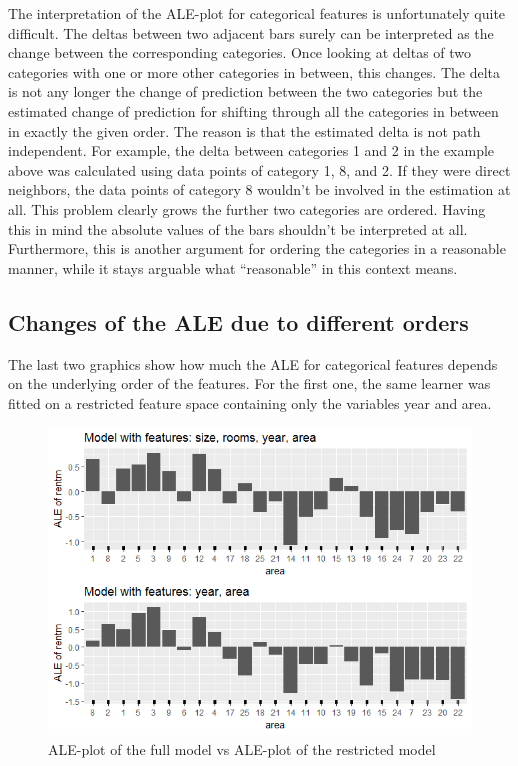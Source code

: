 \documentclass[
]{krantz}
\begin{document}
The interpretation of the ALE-plot for categorical features is unfortunately quite difficult. The deltas between two adjacent bars surely can be interpreted as the change between the corresponding categories. Once looking at deltas of two categories with one or more other categories in between, this changes. The delta is not any longer the change of prediction between the two categories but the estimated change of prediction for shifting through all the categories in between in exactly the given order. The reason is that the estimated delta is not path independent. For example, the delta between categories 1 and 2 in the example above was calculated using data points of category 1, 8, and 2. If they were direct neighbors, the data points of category 8 wouldn't be involved in the estimation at all. This problem clearly grows the further two categories are ordered. Having this in mind the absolute values of the bars shouldn't be interpreted at all. Furthermore, this is another argument for ordering the categories in a reasonable manner, while it stays arguable what ``reasonable'' in this context means.

\hypertarget{changes-of-the-ale-due-to-different-orders}{%
\subsection{Changes of the ALE due to different orders}\label{changes-of-the-ale-due-to-different-orders}}

The last two graphics show how much the ALE for categorical features depends on the underlying order of the features. For the first one, the same learner was fitted on a restricted feature space containing only the variables year and area.

\begin{figure}
\includegraphics[width=1\linewidth]{images/ALE_2_cat_different_features_} \caption{ALE-plot of the full model vs ALE-plot of the restricted model}\label{fig:ALE2catrestrmod}
\end{figure}
\end{document}
